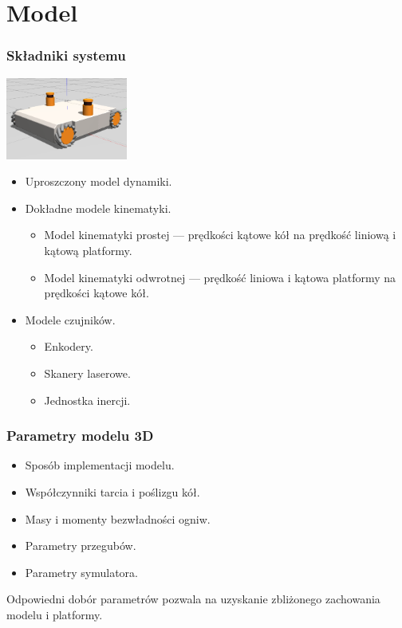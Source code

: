 \documentclass{beamer}
\begin{document}
	\section{Model}
	\begin{frame}
		\frametitle{Składniki systemu}
				\centering
				\includegraphics[width=0.3\textwidth]{graphics/model.png} \\
				\begin{itemize}
					\item Uproszczony model dynamiki.
					\item Dokładne modele kinematyki.
					\begin{itemize}
						\item Model kinematyki prostej --- prędkości kątowe kół na prędkość liniową i kątową platformy.
						\item Model kinematyki odwrotnej --- prędkość liniowa i kątowa platformy na prędkości kątowe kół.
					\end{itemize}
					\item Modele czujników.
					\begin{itemize}
						\item Enkodery.
						\item Skanery laserowe.
						\item Jednostka inercji.
					\end{itemize}
				\end{itemize}
	\end{frame}
	
	\begin{frame}
		\frametitle{Parametry modelu 3D}
		\begin{itemize}
			\item Sposób implementacji modelu.
			\item Współczynniki tarcia i poślizgu kół.
			\item Masy i momenty bezwładności ogniw.
			\item Parametry przegubów.
			\item Parametry symulatora.
		\end{itemize}
		Odpowiedni dobór parametrów pozwala na uzyskanie zbliżonego zachowania modelu i platformy.

	\end{frame}
\end{document}
